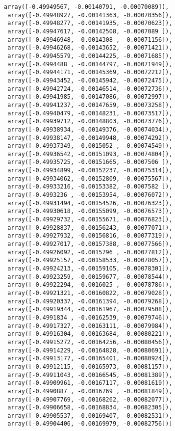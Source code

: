 \documentclass[11pt]{article}
\begin{document}
\begin{tcolorbox}[breakable, size=fbox, boxrule=.5pt, pad at break*=1mm, opacityfill=0]
\begin{Verbatim}[commandchars=\\\{\}]
 array([-0.49949567, -0.00140791, -0.00070089]),
 array([-0.49948927, -0.00141363, -0.00070356]),
 array([-0.49948277, -0.00141935, -0.00070623]),
 array([-0.49947617, -0.00142508, -0.0007089 ]),
 array([-0.49946948, -0.0014308 , -0.00071156]),
 array([-0.49946268, -0.00143652, -0.00071421]),
 array([-0.49945579, -0.00144225, -0.00071685]),
 array([-0.4994488 , -0.00144797, -0.00071949]),
 array([-0.49944171, -0.00145369, -0.00072212]),
 array([-0.49943452, -0.00145942, -0.00072475]),
 array([-0.49942724, -0.00146514, -0.00072736]),
 array([-0.49941985, -0.00147086, -0.00072997]),
 array([-0.49941237, -0.00147659, -0.00073258]),
 array([-0.49940479, -0.00148231, -0.00073517]),
 array([-0.49939712, -0.00148803, -0.00073776]),
 array([-0.49938934, -0.00149376, -0.00074034]),
 array([-0.49938147, -0.00149948, -0.00074292]),
 array([-0.49937349, -0.0015052 , -0.00074549]),
 array([-0.49936542, -0.00151093, -0.00074804]),
 array([-0.49935725, -0.00151665, -0.0007506 ]),
 array([-0.49934899, -0.00152237, -0.00075314]),
 array([-0.49934062, -0.00152809, -0.00075567]),
 array([-0.49933216, -0.00153382, -0.0007582 ]),
 array([-0.4993236 , -0.00153954, -0.00076072]),
 array([-0.49931494, -0.00154526, -0.00076323]),
 array([-0.49930618, -0.00155099, -0.00076573]),
 array([-0.49929732, -0.00155671, -0.00076823]),
 array([-0.49928837, -0.00156243, -0.00077071]),
 array([-0.49927932, -0.00156816, -0.00077319]),
 array([-0.49927017, -0.00157388, -0.00077566]),
 array([-0.49926092, -0.0015796 , -0.00077812]),
 array([-0.49925157, -0.00158533, -0.00078057]),
 array([-0.49924213, -0.00159105, -0.00078301]),
 array([-0.49923259, -0.00159677, -0.00078544]),
 array([-0.49922294, -0.0016025 , -0.00078786]),
 array([-0.49921321, -0.00160822, -0.00079028]),
 array([-0.49920337, -0.00161394, -0.00079268]),
 array([-0.49919344, -0.00161967, -0.00079508]),
 array([-0.4991834 , -0.00162539, -0.00079746]),
 array([-0.49917327, -0.00163111, -0.00079984]),
 array([-0.49916304, -0.00163684, -0.00080221]),
 array([-0.49915272, -0.00164256, -0.00080456]),
 array([-0.49914229, -0.00164828, -0.00080691]),
 array([-0.49913177, -0.00165401, -0.00080924]),
 array([-0.49912115, -0.00165973, -0.00081157]),
 array([-0.49911043, -0.00166545, -0.00081389]),
 array([-0.49909961, -0.00167117, -0.00081619]),
 array([-0.4990887 , -0.0016769 , -0.00081849]),
 array([-0.49907769, -0.00168262, -0.00082077]),
 array([-0.49906658, -0.00168834, -0.00082305]),
 array([-0.49905537, -0.00169407, -0.00082531]),
 array([-0.49904406, -0.00169979, -0.00082756])]
\end{Verbatim}
\end{tcolorbox}
        
\end{document}

